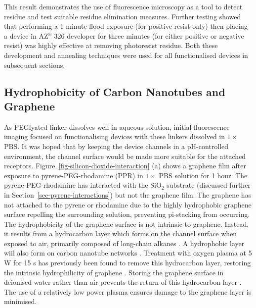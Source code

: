 \documentclass[
  a4paper,
]{scrbook}
\begin{document}
This result demonstrates the use of fluorescence microscopy as a tool to
detect residue and test suitable residue elimination measures. Further
testing showed that performing a 1 minute flood exposure (for positive
resist only) then placing a device in AZ\(^\circledR\) 326 developer for
three minutes (for either positive or negative resist) was highly
effective at removing photoresist residue. Both these development and
annealing techniques were used for all functionalised devices in
subsequent sections.

\hypertarget{sec-hydrophobicity}{%
\subsection{Hydrophobicity of Carbon Nanotubes and
Graphene}\label{sec-hydrophobicity}}

As PEGlyated linker dissolves well in aqueous solution, initial
fluorescence imaging focused on functionalising devices with these
linkers dissolved in \(1 \times\) PBS. It was hoped that by keeping the
device channels in a pH-controlled environment, the channel surface
would be made more suitable for the attached receptors.
Figure~\ref{fig-silicon-dioxide-interaction} (a) shows a graphene film
after exposure to pyrene-PEG-rhodamine (PPR) in \(1 \times\) PBS
solution for 1 hour. The pyrene-PEG-rhodamine has interacted with the
SiO\(_2\) substrate (discussed further in
Section~\ref{sec-pyrene-interactions}) but not the graphene film. The
graphene has not attached to the pyrene or rhodamine due to the highly
hydrophobic graphene surface repelling the surrounding solution,
preventing pi-stacking from occurring. The hydrophobicity of the
graphene surface is not intrinsic to graphene. Instead, it results from
a hydrocarbon layer which forms on the channel surface when exposed to
air, primarily composed of long-chain alkanes
\autocite{Ashraf2014,Palinkas2022}. A hydrophobic layer wiil also form
on carbon nanotube networks \autocite{Stando2019,Park2022}. Treatment
with oxygen plasma at 5 W for 15 s has previously been found to remove
this hydrocarbon layer, restoring the intrinsic hydrophilicity of
graphene \autocite{Shin2010}. Storing the graphene surface in deionised
water rather than air prevents the return of this hydrocarbon layer
\autocite{Ashraf2014}. The use of a relatively low power plasma ensures
damage to the graphene layer is minimised.
\end{document}
